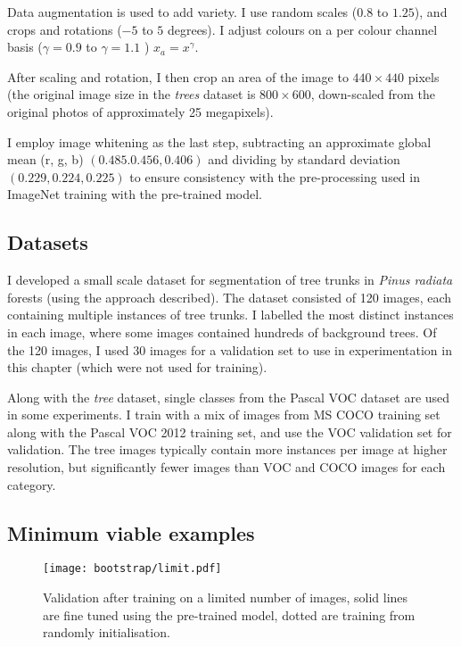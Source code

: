 Data augmentation is used to add variety. I use random scales ($0.8$ to $1.25$), and crops and rotations ($-5$ to $5$ degrees). I adjust colours on a per colour channel basis ($ \gamma = 0.9 $ to $ \gamma=1.1 $ )  $ x_a = x^{\gamma} $.

After scaling and rotation, I then crop an area of the image to $440 \times 440$ pixels (the original image size in the \emph{trees} dataset is $800 \times 600$, down-scaled from the original photos of approximately 25 megapixels).

I employ image whitening as the last step, subtracting an approximate global mean (r, g, b) $ (0.485. 0.456, 0.406) $ and dividing by standard deviation $ (0.229, 0.224, 0.225) $  to ensure consistency with the pre-processing used in ImageNet training with the pre-trained model.



\subsection {Datasets}




I developed a small scale dataset for segmentation of tree trunks in \emph{Pinus radiata} forests (using the approach described). The dataset consisted of 120 images, each containing multiple instances of tree trunks. I labelled the most distinct instances in each image, where some images contained hundreds of background trees. Of the 120 images, I used 30 images for a validation set to use in experimentation in this chapter (which were not used for training).

Along with the \emph{tree} dataset, single classes from the Pascal VOC dataset are used in some experiments. I train with a mix of images from MS COCO \cite{Lin2014} training set along with the Pascal VOC 2012 training set, and use the VOC validation set for validation. The tree images typically contain more instances per image at higher resolution, but significantly fewer images than VOC and COCO images for each category.


\subsection {Minimum viable examples}

\begin{figure}[ht!]

  
\centering
\texttt{[image: bootstrap/limit.pdf]}
\caption {Validation after training on a limited number of images, solid lines are fine tuned using the pre-trained model, dotted are training from randomly initialisation. }
\label{fig:bootstrap_limited}

\bigskip
\end{figure}

